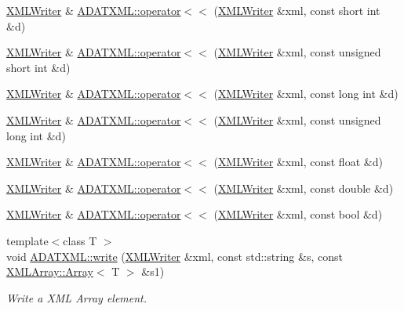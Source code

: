 \begin{DoxyCompactItemize}
\mbox{\hyperlink{classADATXML_1_1XMLWriter}{X\+M\+L\+Writer}} \& \mbox{\hyperlink{group__io_ga2892faecb11d9475723b52bcae10aa04}{A\+D\+A\+T\+X\+M\+L\+::operator$<$$<$}} (\mbox{\hyperlink{classADATXML_1_1XMLWriter}{X\+M\+L\+Writer}} \&xml, const short int \&d)
\item 
\mbox{\hyperlink{classADATXML_1_1XMLWriter}{X\+M\+L\+Writer}} \& \mbox{\hyperlink{group__io_gac4bf68c17fbdb50450cfa2d338d09685}{A\+D\+A\+T\+X\+M\+L\+::operator$<$$<$}} (\mbox{\hyperlink{classADATXML_1_1XMLWriter}{X\+M\+L\+Writer}} \&xml, const unsigned short int \&d)
\item 
\mbox{\hyperlink{classADATXML_1_1XMLWriter}{X\+M\+L\+Writer}} \& \mbox{\hyperlink{group__io_gadc0e2c541a279b5a007e13f6f73ecf45}{A\+D\+A\+T\+X\+M\+L\+::operator$<$$<$}} (\mbox{\hyperlink{classADATXML_1_1XMLWriter}{X\+M\+L\+Writer}} \&xml, const long int \&d)
\item 
\mbox{\hyperlink{classADATXML_1_1XMLWriter}{X\+M\+L\+Writer}} \& \mbox{\hyperlink{group__io_gaaf0b05a50d9a15119bf89b91d941b9d2}{A\+D\+A\+T\+X\+M\+L\+::operator$<$$<$}} (\mbox{\hyperlink{classADATXML_1_1XMLWriter}{X\+M\+L\+Writer}} \&xml, const unsigned long int \&d)
\item 
\mbox{\hyperlink{classADATXML_1_1XMLWriter}{X\+M\+L\+Writer}} \& \mbox{\hyperlink{group__io_ga5bf37d07fe43369189518f64fd8ca05d}{A\+D\+A\+T\+X\+M\+L\+::operator$<$$<$}} (\mbox{\hyperlink{classADATXML_1_1XMLWriter}{X\+M\+L\+Writer}} \&xml, const float \&d)
\item 
\mbox{\hyperlink{classADATXML_1_1XMLWriter}{X\+M\+L\+Writer}} \& \mbox{\hyperlink{group__io_ga3325d0cff5609ce8a1d74b516e9dfcf8}{A\+D\+A\+T\+X\+M\+L\+::operator$<$$<$}} (\mbox{\hyperlink{classADATXML_1_1XMLWriter}{X\+M\+L\+Writer}} \&xml, const double \&d)
\item 
\mbox{\hyperlink{classADATXML_1_1XMLWriter}{X\+M\+L\+Writer}} \& \mbox{\hyperlink{group__io_ga9d2ed7a5f0ca12a3b4f993f19ee4473e}{A\+D\+A\+T\+X\+M\+L\+::operator$<$$<$}} (\mbox{\hyperlink{classADATXML_1_1XMLWriter}{X\+M\+L\+Writer}} \&xml, const bool \&d)
\item 
{\footnotesize template$<$class T $>$ }\\void \mbox{\hyperlink{group__io_ga505002df14eea0ecd6a4c92bfdc6425d}{A\+D\+A\+T\+X\+M\+L\+::write}} (\mbox{\hyperlink{classADATXML_1_1XMLWriter}{X\+M\+L\+Writer}} \&xml, const std\+::string \&s, const \mbox{\hyperlink{classXMLArray_1_1Array}{X\+M\+L\+Array\+::\+Array}}$<$ T $>$ \&s1)
\begin{DoxyCompactList}\small\item\em Write a X\+ML Array element. \end{DoxyCompactList}\item 

\end{DoxyCompactItemize}
